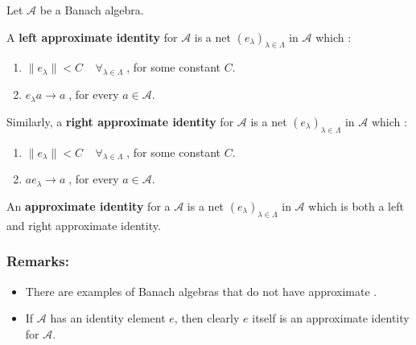 \documentclass[12pt]{article}
\begin{document}
Let $\mathcal{A}$ be a Banach algebra.

A {\bf left approximate identity} for $\mathcal{A}$ is a net $(e_{\lambda})_{\lambda \in \Lambda}$ in $\mathcal{A}$ which :
\begin{enumerate}
\item $\|e_{\lambda}\| < C \;\;\;\; \forall_{\lambda \in \Lambda} \;$, for some constant $C$.
\item $e_{\lambda}a \longrightarrow a\;$, for every $a \in \mathcal{A}$.
\end{enumerate}

Similarly, a {\bf right approximate identity} for $\mathcal{A}$ is a net $(e_{\lambda})_{\lambda \in \Lambda}$ in $\mathcal{A}$ which :
\begin{enumerate}
\item $\|e_{\lambda}\| < C \;\;\;\; \forall_{\lambda \in \Lambda} \;$, for some constant $C$.
\item $ae_{\lambda} \longrightarrow a\;$, for every $a \in \mathcal{A}$.
\end{enumerate}

An {\bf approximate identity} for a $\mathcal{A}$ is a net $(e_{\lambda})_{\lambda \in \Lambda}$ in $\mathcal{A}$ which is both a left and right approximate identity.

\subsubsection{Remarks:}
\begin{itemize}
\item There are examples of Banach algebras that do not have approximate .
\item If $\mathcal{A}$ has an identity element $e$, then clearly $e$ itself is an approximate identity for $\mathcal{A}$.
\end{itemize}
\end{document}

